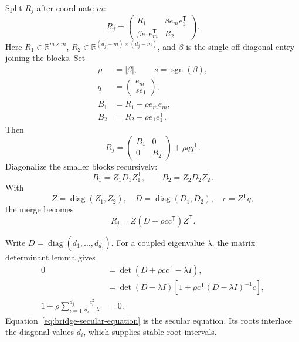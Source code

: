 \documentclass[10pt,twocolumn]{article}
\begin{document}
Split \(R_j\) after coordinate \(m\):
\begin{equation}
R_j=
\begin{pmatrix}
R_1&\beta e_me_1^{\mathsf T}\\
\beta e_1e_m^{\mathsf T}&R_2
\end{pmatrix}.
\label{eq:bridge-divide-split}
\end{equation}
Here \(R_1\in\mathbb R^{m\times m}\),
\(R_2\in\mathbb R^{(d_j-m)\times(d_j-m)}\), and \(\beta\) is the single
off-diagonal entry joining the blocks. Set
\begin{align}
\rho&=|\beta|,
\qquad s=\operatorname{sgn}(\beta),
\label{eq:bridge-rank-one-sign}\\
q&=
\begin{pmatrix}
e_m\\se_1
\end{pmatrix},
\label{eq:bridge-rank-one-vector}\\
B_1&=R_1-\rho e_me_m^{\mathsf T},
\label{eq:bridge-adjusted-block-1}\\
B_2&=R_2-\rho e_1e_1^{\mathsf T}.
\label{eq:bridge-adjusted-block-2}
\end{align}
Then
\begin{equation}
R_j=
\begin{pmatrix}
B_1&0\\0&B_2
\end{pmatrix}
+\rho qq^{\mathsf T}.
\label{eq:bridge-rank-one-merge}
\end{equation}
Diagonalize the smaller blocks recursively:
\begin{equation}
B_1=Z_1D_1Z_1^{\mathsf T},
\qquad
B_2=Z_2D_2Z_2^{\mathsf T}.
\label{eq:bridge-recursive-block-eigensystems}
\end{equation}
With
\begin{equation}
Z=\operatorname{diag}(Z_1,Z_2),
\quad
D=\operatorname{diag}(D_1,D_2),
\quad
c=Z^{\mathsf T}q,
\label{eq:bridge-diagonal-plus-rank-one-data}
\end{equation}
the merge becomes
\begin{equation}
R_j=Z(D+\rho cc^{\mathsf T})Z^{\mathsf T}.
\label{eq:bridge-diagonal-plus-rank-one}
\end{equation}

Write \(D=\operatorname{diag}(d_1,\ldots,d_{d_j})\). For a coupled
eigenvalue \(\lambda\), the matrix determinant lemma gives
\begin{align}
0
&=\det(D+\rho cc^{\mathsf T}-\lambda I),
\label{eq:bridge-secular-det-1}\\
&=\det(D-\lambda I)
\left[1+\rho c^{\mathsf T}(D-\lambda I)^{-1}c\right],
\label{eq:bridge-secular-det-2}\\
1+\rho\sum_{i=1}^{d_j}\frac{c_i^2}{d_i-\lambda}
&=0.
\label{eq:bridge-secular-equation}
\end{align}
Equation~\eqref{eq:bridge-secular-equation} is the secular equation. Its roots
interlace the diagonal values \(d_i\), which supplies stable root intervals.
\end{document}
